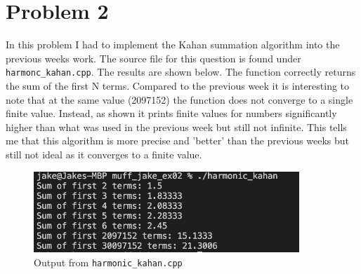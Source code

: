 \documentclass[12pt]{article}
\begin{document}
\section*{Problem 2}
In this problem I had to implement the Kahan summation algorithm into the previous weeks 
work. The source file for this question is found under \lstinline{harmonc_kahan.cpp}.
The results are shown below. The function correctly returns the sum of the first N terms. Compared to the previous week it is interesting to note that at the same value (2097152) the function does not converge to a single finite value. Instead, as shown
it prints finite values for numbers significantly higher than what was used in the previous week but still not infinite. This tells me that this algorithm is more precise and 'better' than the previous weeks 
but still not ideal as it converges to a finite value. 

\begin{figure}
    
    \includegraphics[width=10cm]{harmonc_kahan.png}
    \centering
    \caption{Output from \lstinline{harmonic_kahan.cpp}}

\end{figure}
\end{document}
